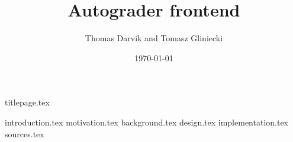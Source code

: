 \documentclass[12pt]{report}
\title{Autograder frontend}
\author{Thomas Darvik and Tomasz Gliniecki}
\date{\today}
\begin{document}
{titlepage.tex}
{}
\tableofcontents
{}

{introduction.tex}
{motivation.tex}
{background.tex}
{design.tex}
{implementation.tex}
{sources.tex}
\end{document}
